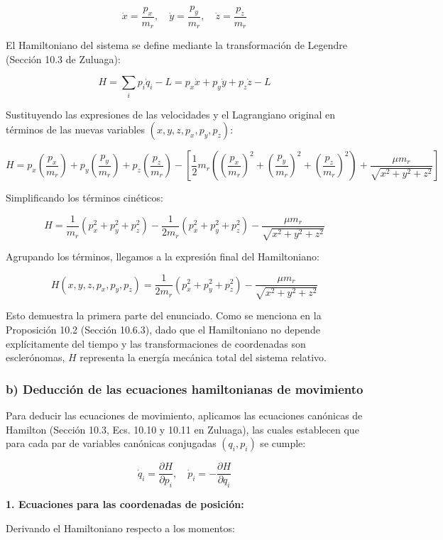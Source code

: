 \documentclass[a4paper]{article}
\begin{document}
$$\dot{x} = \frac{p_x}{m_r}, \quad \dot{y} = \frac{p_y}{m_r}, \quad \dot{z} = \frac{p_z}{m_r}$$

El Hamiltoniano del sistema se define mediante la transformación de Legendre (Sección 10.3 de Zuluaga):

$$H = \sum_{i} p_i \dot{q}_i - L = p_x \dot{x} + p_y \dot{y} + p_z \dot{z} - L$$

Sustituyendo las expresiones de las velocidades y el Lagrangiano original en términos de las nuevas variables $(x, y, z, p_x, p_y, p_z)$:

$$H = p_x \left(\frac{p_x}{m_r}\right) + p_y \left(\frac{p_y}{m_r}\right) + p_z \left(\frac{p_z}{m_r}\right) - \left[ \frac{1}{2}m_r \left( \left(\frac{p_x}{m_r}\right)^2 + \left(\frac{p_y}{m_r}\right)^2 + \left(\frac{p_z}{m_r}\right)^2 \right) + \frac{\mu m_r}{\sqrt{x^2 + y^2 + z^2}} \right]$$

Simplificando los términos cinéticos:

$$H = \frac{1}{m_r}(p_x^2 + p_y^2 + p_z^2) - \frac{1}{2m_r}(p_x^2 + p_y^2 + p_z^2) - \frac{\mu m_r}{\sqrt{x^2 + y^2 + z^2}}$$

Agrupando los términos, llegamos a la expresión final del Hamiltoniano:

$$H(x, y, z, p_x, p_y, p_z) = \frac{1}{2m_r} \left(p_x^2 + p_y^2 + p_z^2\right) - \frac{\mu m_r}{\sqrt{x^2 + y^2 + z^2}}$$

Esto demuestra la primera parte del enunciado. Como se menciona en la Proposición 10.2 (Sección 10.6.3), dado que el Hamiltoniano no depende explícitamente del tiempo y las transformaciones de coordenadas son esclerónomas, $H$ representa la energía mecánica total del sistema relativo.

\subsubsection*{b) Deducción de las ecuaciones hamiltonianas de movimiento}

Para deducir las ecuaciones de movimiento, aplicamos las ecuaciones canónicas de Hamilton (Sección 10.3, Ecs. 10.10 y 10.11 en Zuluaga), las cuales establecen que para cada par de variables canónicas conjugadas $(q_i, p_i)$ se cumple:

$$\dot{q}_i = \frac{\partial H}{\partial p_i}, \quad \dot{p}_i = -\frac{\partial H}{\partial q_i}$$

\textbf{1. Ecuaciones para las coordenadas de posición:}

Derivando el Hamiltoniano respecto a los momentos:
\end{document}

